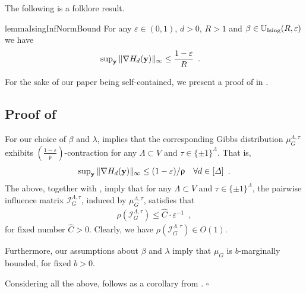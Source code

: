 \documentclass[11pt,reqno]{amsart}
\numberwithin{equation}{section}
\newcommand{\cI}{{\mathcal{I}}}
\newcommand{\bostonuniversityred}[1]{{\color{bostonuniversityred}#1}}
\newcommand{\goldenbrown}[1]{{\color{goldenbrown}#1}}
\newcommand{\red}[1]{{\color{red}#1}}
\newcommand{\maxDeg}{{\Delta}}
\newcommand{\UnIsing}{{\mathbb{U}_{\rm Ising}}}
\newcommand{\logtrecur}{H}
\newcommand{\infmatrix}{\cI}
\newcommand{\spradius}{{\rho}}
\newcommand{\norm}[2]{\goldenbrown{\|} #1 \goldenbrown{\|}_{#2}}
\renewcommand{\bostonuniversityred}[1]{#1}
\renewcommand{\goldenbrown}[1]{#1}
\renewcommand{\red}[1]{#1}
\newcommand{\kR}{\bostonuniversityred{R}}%
\renewcommand{\kR}{R}
\newcommand{\SingBound}{\uprho}
\begin{document}
The following is a folklore result. 

\begin{restatable}{lemma}{IsingInfNormBound}\label{lemma:IsingInfNormBound}
For any $\varepsilon \in (0,1)$, $d>0$, $\kR > 1$ and $\beta\in \UnIsing(\kR,\varepsilon )$
we have
{\small 
\begin{align}\label{eq:lemma:IsingInfNormBound}
\sup\nolimits_{\bf y}\norm{\nabla \logtrecur_d ({\bf y})}{\infty} &\leq { \frac{1-\varepsilon}{\kR}} \enspace.
\end{align}
}
\end{restatable}
For the sake of our paper being self-contained, we present a proof of  in
.

\subsection{Proof of }\label{sec:thrm:Ising4SPRadiusHash}

 


For our choice of $\beta$ and $\lambda$,   implies 
% 
that the corresponding Gibbs distribution  $\mu^{\Lambda,\tau}_G$ exhibits $\left( \frac{1-\varepsilon}{\SingBound}\right)$-contraction
for any $\Lambda\subset V$ and $\tau\in \{\pm 1\}^{\Lambda}$. That is, 
\begin{align}\nonumber 
\sup\nolimits_{\bf y}\norm{\nabla \logtrecur_d ({\bf y})}{\infty} &\leq ({1-\varepsilon})/{\SingBound} & \forall d\in [\maxDeg] \enspace.
\end{align}
The above, together with ,  imply that 
for any $\Lambda\subset V$ and $\tau\in \{\pm 1\}^{\Lambda}$, the pairwise influence 
matrix $\infmatrix^{\Lambda,\tau}_{G}$, induced by $\mu^{\Lambda,\tau}_G$, satisfies that 
%
\begin{align}\nonumber 
\spradius(\infmatrix^{\Lambda,\tau}_{G})\leq \widehat{C} \cdot \varepsilon^{-1} \enspace,
\end{align}
%
for fixed number $\widehat{C}>0$. Clearly, we have $\spradius(\infmatrix^{\Lambda,\tau}_{G})\in O(1)$. 


Furthermore, our assumptions about $\beta$ and $\lambda$ imply that $\mu_G$ is $b$-marginally bounded, 
for fixed $b>0$. 


Considering all the above,  follows as a corollary from .
\hfill $\square$
\end{document}
